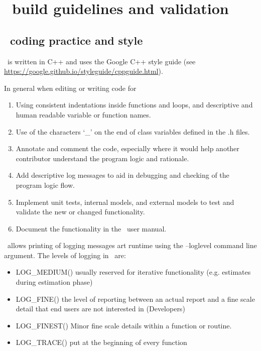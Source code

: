 \section{\CNAME\ build guidelines and validation\label{sec:buildrules}}

\subsection{\CNAME\ coding practice and style}\label{subsec:codepractive}

\CNAME\ is written in C++ and uses the Google C++ style guide (see \url{https://google.github.io/styleguide/cppguide.html}). 

In general when editing or writing code for \CNAME\:
\begin{enumerate}
  \item Using consistent indentations inside functions and loops, and descriptive and human readable variable or function names.
  \item Use of the characters `\_' on the end of class variables defined in the .h files. 
  \item Annotate and comment the code, especially where it would help another contributor understand the program logic and rationale.
  \item Add descriptive log messages to aid in debugging and checking of the program logic flow.
  \item Implement unit tests, internal models, and external models to test and validate the new or changed functionality.
  \item Document the functionality in the \CNAME\ user manual.
\end{enumerate}

\CNAME\ allows printing of logging messages art runtime using the --loglevel command line argument. The levels of logging in \CNAME\ are:
\begin{itemize}
	\item LOG\_MEDIUM()  usually reserved for iterative functionality (e.g. estimates during estimation phase)
	\item LOG\_FINE() the level of reporting between an actual report and a fine scale detail that end users are not interested in (Developers)
	\item LOG\_FINEST() Minor fine scale details within a function or routine.
	\item LOG\_TRACE() put at the beginning of every function
\end{itemize}

